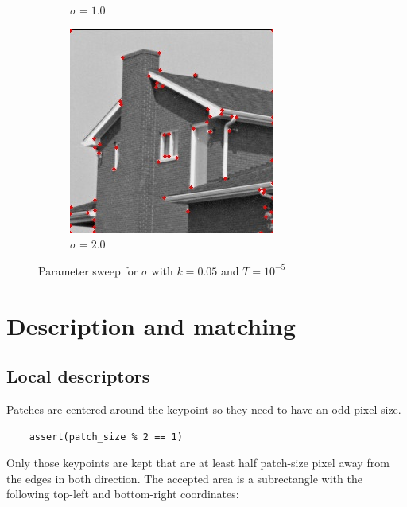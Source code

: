 \documentclass[10pt,a4paper,twoside]{article}
\begin{document}
\begin{figure}[h]
\begin{subfigure}{0.25\textwidth}
    \caption{$\sigma=1.0$}
    \end{subfigure}
    \begin{subfigure}{0.25\textwidth}
    \includegraphics[width=0.9\linewidth, height=0.9\linewidth]{sweep_house/house_20_005_1e-05.jpg} 
    \caption{$\sigma=2.0$}
    \end{subfigure}
    \caption{Parameter sweep for $\sigma$ with $k=0.05$ and $T=10^{-5}$}

\end{figure}

\clearpage

\section{Description and matching}
\subsection{Local descriptors}

Patches are centered around the keypoint so they need to have an odd pixel size.
\begin{verbatim}
    assert(patch_size % 2 == 1)
\end{verbatim}

Only those keypoints are kept that are at least half patch-size pixel away from
the edges in both direction. The accepted area is a subrectangle with the
following top-left and bottom-right coordinates:
\end{document}
